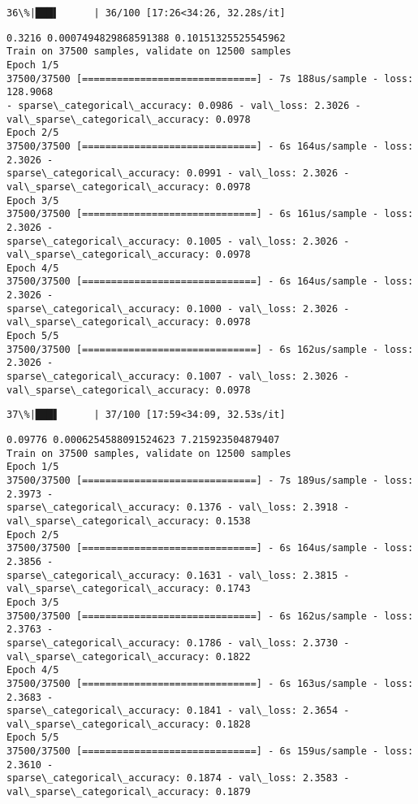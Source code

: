 \documentclass[11pt]{article}
\begin{document}
    \begin{Verbatim}[commandchars=\\\{\}]
 36\%|███▌      | 36/100 [17:26<34:26, 32.28s/it]
    \end{Verbatim}

    \begin{Verbatim}[commandchars=\\\{\}]
0.3216 0.0007494829868591388 0.10151325525545962
Train on 37500 samples, validate on 12500 samples
Epoch 1/5
37500/37500 [==============================] - 7s 188us/sample - loss: 128.9068
- sparse\_categorical\_accuracy: 0.0986 - val\_loss: 2.3026 -
val\_sparse\_categorical\_accuracy: 0.0978
Epoch 2/5
37500/37500 [==============================] - 6s 164us/sample - loss: 2.3026 -
sparse\_categorical\_accuracy: 0.0991 - val\_loss: 2.3026 -
val\_sparse\_categorical\_accuracy: 0.0978
Epoch 3/5
37500/37500 [==============================] - 6s 161us/sample - loss: 2.3026 -
sparse\_categorical\_accuracy: 0.1005 - val\_loss: 2.3026 -
val\_sparse\_categorical\_accuracy: 0.0978
Epoch 4/5
37500/37500 [==============================] - 6s 164us/sample - loss: 2.3026 -
sparse\_categorical\_accuracy: 0.1000 - val\_loss: 2.3026 -
val\_sparse\_categorical\_accuracy: 0.0978
Epoch 5/5
37500/37500 [==============================] - 6s 162us/sample - loss: 2.3026 -
sparse\_categorical\_accuracy: 0.1007 - val\_loss: 2.3026 -
val\_sparse\_categorical\_accuracy: 0.0978
    \end{Verbatim}

    \begin{Verbatim}[commandchars=\\\{\}]
 37\%|███▋      | 37/100 [17:59<34:09, 32.53s/it]
    \end{Verbatim}

    \begin{Verbatim}[commandchars=\\\{\}]
0.09776 0.0006254588091524623 7.215923504879407
Train on 37500 samples, validate on 12500 samples
Epoch 1/5
37500/37500 [==============================] - 7s 189us/sample - loss: 2.3973 -
sparse\_categorical\_accuracy: 0.1376 - val\_loss: 2.3918 -
val\_sparse\_categorical\_accuracy: 0.1538
Epoch 2/5
37500/37500 [==============================] - 6s 164us/sample - loss: 2.3856 -
sparse\_categorical\_accuracy: 0.1631 - val\_loss: 2.3815 -
val\_sparse\_categorical\_accuracy: 0.1743
Epoch 3/5
37500/37500 [==============================] - 6s 162us/sample - loss: 2.3763 -
sparse\_categorical\_accuracy: 0.1786 - val\_loss: 2.3730 -
val\_sparse\_categorical\_accuracy: 0.1822
Epoch 4/5
37500/37500 [==============================] - 6s 163us/sample - loss: 2.3683 -
sparse\_categorical\_accuracy: 0.1841 - val\_loss: 2.3654 -
val\_sparse\_categorical\_accuracy: 0.1828
Epoch 5/5
37500/37500 [==============================] - 6s 159us/sample - loss: 2.3610 -
sparse\_categorical\_accuracy: 0.1874 - val\_loss: 2.3583 -
val\_sparse\_categorical\_accuracy: 0.1879
    \end{Verbatim}
\end{document}
